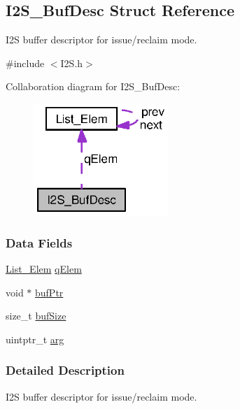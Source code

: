 \subsection{I2\+S\+\_\+\+Buf\+Desc Struct Reference}
\label{struct_i2_s___buf_desc}


I2\+S buffer descriptor for issue/reclaim mode.  




{\ttfamily \#include $<$I2\+S.\+h$>$}



Collaboration diagram for I2\+S\+\_\+\+Buf\+Desc\+:
\nopagebreak
\begin{figure}[H]
\begin{center}
\leavevmode
\includegraphics[width=144pt]{struct_i2_s___buf_desc__coll__graph}
\end{center}
\end{figure}
\subsubsection*{Data Fields}
\begin{DoxyCompactItemize}
\item 
\hyperlink{struct_list___elem}{List\+\_\+\+Elem} \hyperlink{struct_i2_s___buf_desc_ad521da1d3692dbbcefbff1fe13e1916d}{q\+Elem}
\item 
void $\ast$ \hyperlink{struct_i2_s___buf_desc_a63edcc97dba1524e4a63a055a6face33}{buf\+Ptr}
\item 
size\+\_\+t \hyperlink{struct_i2_s___buf_desc_a2d650ead8a0d337cb4d292e52e1a02c5}{buf\+Size}
\item 
uintptr\+\_\+t \hyperlink{struct_i2_s___buf_desc_a572be4bbbf39c6d7a0745829684676e1}{arg}
\end{DoxyCompactItemize}


\subsubsection{Detailed Description}
I2\+S buffer descriptor for issue/reclaim mode. 

